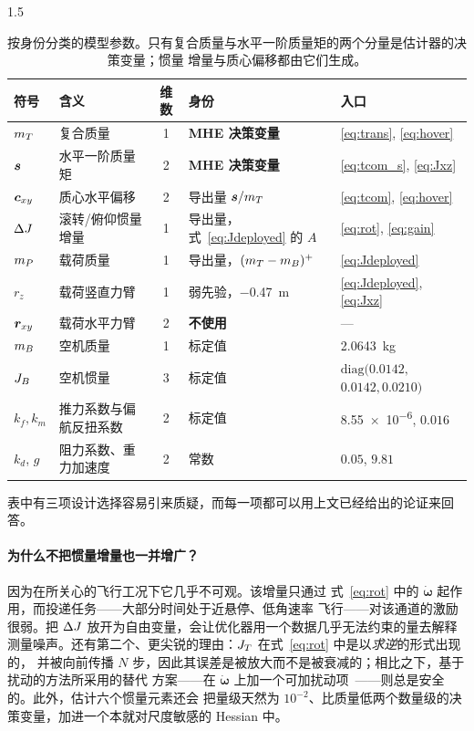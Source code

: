\begin{spacing}{1.5}
\begin{table}[ht]
\caption{按身份分类的模型参数。只有复合质量与水平一阶质量矩的两个分量是估计器的决策变量；惯量
增量与质心偏移都由它们生成。}
\label{tab:params}
\centering
\footnotesize
\begin{tabular}{@{}l p{} c p{} p{}@{}}
\toprule
符号 & 含义 & 维数 & 身份 & 入口 \\
\midrule
$m_T$ & 复合质量 & 1 & \textbf{MHE 决策变量} & \eqref{eq:trans}, \eqref{eq:hover} \\
$\bm{s}$ & 水平一阶质量矩 & 2 & \textbf{MHE 决策变量} & \eqref{eq:tcom_s}, \eqref{eq:Jxz} \\
\midrule
$\bm{c}_{xy}$ & 质心水平偏移 & 2 & 导出量 $\bm{s}/m_T$ & \eqref{eq:tcom}, \eqref{eq:hover} \\
$\Delta J$ & 滚转/俯仰惯量增量 & 1 & 导出量，式~\eqref{eq:Jdeployed} 的 $A$ & \eqref{eq:rot}, \eqref{eq:gain} \\
$m_P$ & 载荷质量 & 1 & 导出量，$(m_T-m_B)^{+}$ & \eqref{eq:Jdeployed} \\
\midrule
$r_z$ & 载荷竖直力臂 & 1 & 弱先验，\SI{-0.47}{\meter} & \eqref{eq:Jdeployed}, \eqref{eq:Jxz} \\
$\bm{r}_{xy}$ & 载荷水平力臂 & 2 & \textbf{不使用} & --- \\
\midrule
$m_B$ & 空机质量 & 1 & 标定值 & \SI{2.0643}{\kg} \\
$J_B$ & 空机惯量 & 3 & 标定值 & $\mathrm{diag}(0.0142,$ $0.0142, 0.0210)$ \\
$k_f, k_m$ & 推力系数与偏航反扭系数 & 2 & 标定值 & \SI{8.55e-6}{}, $0.016$ \\
$k_d$, $g$ & 阻力系数、重力加速度 & 2 & 常数 & $0.05$, $9.81$ \\
\bottomrule
\end{tabular}
\end{table}

表中有三项设计选择容易引来质疑，而每一项都可以用上文已经给出的论证来回答。

\paragraph{为什么不把惯量增量也一并增广？}因为在所关心的飞行工况下它几乎不可观。该增量只通过
式~\eqref{eq:rot} 中的 $\dot{\bm{\omega}}$ 起作用，而投递任务——大部分时间处于近悬停、低角速率
飞行——对该通道的激励很弱。把 $\Delta J$ 放开为自由变量，会让优化器用一个数据几乎无法约束的量去解释
测量噪声。还有第二个、更尖锐的理由：$J_T$ 在式~\eqref{eq:rot} 中是以\emph{求逆}的形式出现的，
并被向前传播 $N$ 步，因此其误差是被放大而不是被衰减的；相比之下，基于扰动的方法所采用的替代
方案——在 $\dot{\bm\omega}$ 上加一个可加扰动项~\cite{hanover2021}——则总是安全的。此外，估计六个惯量元素还会
把量级天然为 $10^{-2}$、比质量低两个数量级的决策变量，加进一个本就对尺度敏感的 Hessian 中。


\end{spacing}
